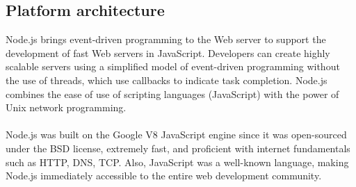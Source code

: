 \subsection{Platform architecture}
Node.js brings event-driven programming to the Web server to support the development of fast Web servers in JavaScript. Developers can create highly scalable servers using a simplified model of event-driven programming without the use of threads, which use callbacks to indicate task completion. Node.js combines the ease of use of scripting languages (JavaScript) with the power of Unix network programming. \\ \\ Node.js was built on the Google V8 JavaScript engine since it was open-sourced under the BSD license, extremely fast, and proficient with internet fundamentals such as HTTP, DNS, TCP. Also, JavaScript was a well-known language, making Node.js immediately accessible to the entire web development community.

